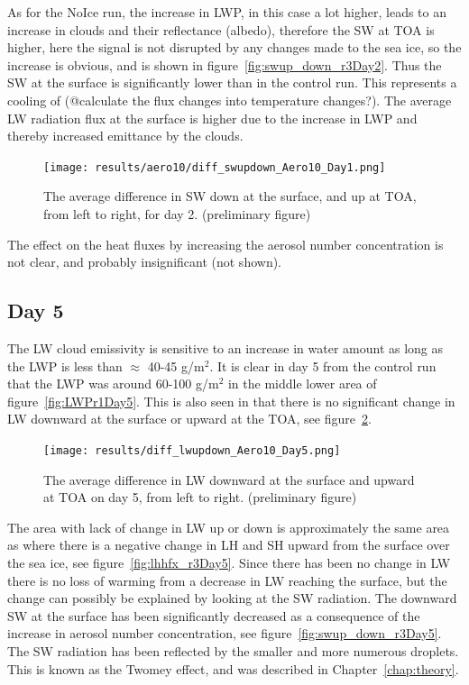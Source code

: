 As for the NoIce run, the increase in LWP, in this case a lot higher, leads to an increase in clouds and their reflectance (albedo), therefore the SW at TOA is higher, here the signal is not disrupted by any changes made to the sea ice, so the increase is obvious, and is shown in figure~\ref{fig:swup_down_r3Day2}. Thus the SW at the surface is significantly lower than in the control run. This represents a cooling of (@calculate the flux changes into temperature changes?). The average LW radiation flux at the surface is higher due to the increase in LWP and thereby increased emittance by the clouds.%
\begin{figure}
\centering
\texttt{[image: results/aero10/diff\_swupdown\_Aero10\_Day1.png]}
\caption{The average difference in SW down at the surface, and up at TOA, from left to right, for day 2. (preliminary figure)}
\label{fig:swup_down_r3Day1}
\end{figure}
The effect on the heat fluxes by increasing the aerosol number concentration is not clear, and probably insignificant (not shown).

\subsection{Day 5}
The LW cloud emissivity is sensitive to an increase in water amount as long as the LWP is less than $\approx$ 40-45 g/m$^2$. It is clear in day 5 from the control run that the LWP was around 60-100 g/m$^2$ in the middle lower area of figure~\ref{fig:LWPr1Day5}.%
This is also seen in that there is no significant change in LW downward at the surface or upward at the TOA, see figure~\ref{fig:lwup_down_r3Day5}.

\begin{figure}[h!]
\centering
\texttt{[image: results/diff\_lwupdown\_Aero10\_Day5.png]}
\caption{The average difference in LW downward at the surface and upward at TOA on day 5, from left to right. (preliminary figure)}
\label{fig:lwup_down_r3Day5}
\end{figure}

The area with lack of change in LW up or down is approximately the same area as where there is a negative change in LH and SH upward from the surface over the sea ice, see figure~\ref{fig:lhhfx_r3Day5}. Since there has been no change in LW there is no loss of warming from a decrease in LW reaching the surface, but the change can possibly be explained by looking at the SW radiation. The downward SW at the surface has been significantly decreased as a consequence of the increase in aerosol number concentration, see figure~\ref{fig:swup_down_r3Day5}. The SW radiation has been reflected by the smaller and more numerous droplets. This is known as the Twomey effect, and was described in Chapter~\ref{chap:theory}. 

